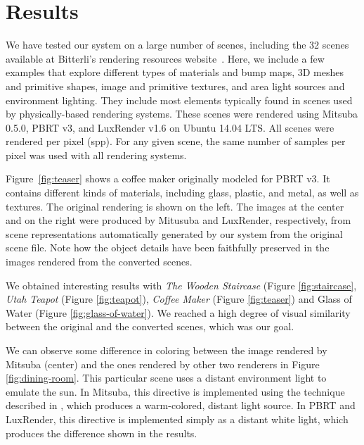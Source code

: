 \section{Results}
\label{sec:results}

We have tested our system on a large number of scenes, including the 32 scenes available
at Bitterli's rendering resources website~\cite{resources16}. 
Here, we include a few examples that explore different 
types of materials and bump maps, 3D meshes and primitive shapes, image and 
primitive textures, and area light sources and environment lighting. They include most elements typically found in scenes used by physically-based rendering systems.
% 
%
These scenes were rendered using Mitsuba 0.5.0, PBRT v3, and LuxRender v1.6 on 
Ubuntu 14.04 LTS. All scenes were rendered  per pixel (spp). For any given scene,
the same number of samples per pixel was used with all rendering systems. 

Figure~\ref{fig:teaser} shows a coffee maker originally modeled for PBRT v3. It contains different kinds of materials, including glass, plastic, and metal, as well as textures.  The original rendering is shown on the left. The images at the center and on the right were produced by Mitusuba and LuxRender, respectively, from scene representations automatically generated by our system from the original scene file. Note how the object details have been faithfully preserved in the images rendered from the converted scenes. 

We obtained interesting results with \textit{The Wooden Staircase} (Figure 
\ref{fig:staircase}, \textit{Utah Teapot} (Figure \ref{fig:teapot}), 
\textit{Coffee Maker} (Figure \ref{fig:teaser}) and Glass of Water (Figure 
\ref{fig:glass-of-water}). We reached a high degree of visual similarity between 
the original and the converted scenes, which was our goal.

We can observe some difference in coloring between the image rendered by Mitsuba 
(center) and the ones rendered by other two renderers in Figure 
\ref{fig:dining-room}. This particular scene uses a distant environment light to 
emulate the sun. In Mitsuba, this directive is implemented using the technique 
described in \cite{Preetham}, which produces a warm-colored, distant light source. In 
PBRT and LuxRender, this directive is implemented simply as a distant white 
light, which produces the difference shown in the results.

